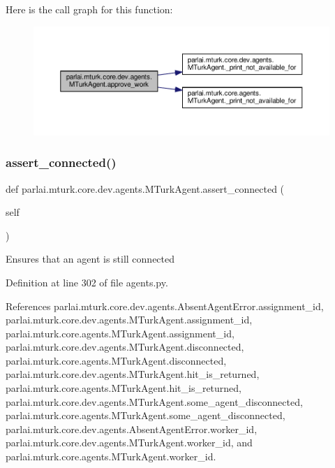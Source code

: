 Here is the call graph for this function\+:
\nopagebreak
\begin{figure}[H]
\begin{center}
\leavevmode
\includegraphics[width=350pt]{classparlai_1_1mturk_1_1core_1_1dev_1_1agents_1_1MTurkAgent_adb726f0723f56988385241a17068bea6_cgraph}
\end{center}
\end{figure}
\mbox{\label{classparlai_1_1mturk_1_1core_1_1dev_1_1agents_1_1MTurkAgent_a9761bfc34d22aae02017a258276dfaa8}} 
\subsubsection{\texorpdfstring{assert\+\_\+connected()}{assert\_connected()}}
{\footnotesize\ttfamily def parlai.\+mturk.\+core.\+dev.\+agents.\+M\+Turk\+Agent.\+assert\+\_\+connected (\begin{DoxyParamCaption}\item[{}]{self }\end{DoxyParamCaption})}

\begin{DoxyVerb}Ensures that an agent is still connected\end{DoxyVerb}
 

Definition at line 302 of file agents.\+py.



References parlai.\+mturk.\+core.\+dev.\+agents.\+Absent\+Agent\+Error.\+assignment\+\_\+id, parlai.\+mturk.\+core.\+dev.\+agents.\+M\+Turk\+Agent.\+assignment\+\_\+id, parlai.\+mturk.\+core.\+agents.\+M\+Turk\+Agent.\+assignment\+\_\+id, parlai.\+mturk.\+core.\+dev.\+agents.\+M\+Turk\+Agent.\+disconnected, parlai.\+mturk.\+core.\+agents.\+M\+Turk\+Agent.\+disconnected, parlai.\+mturk.\+core.\+dev.\+agents.\+M\+Turk\+Agent.\+hit\+\_\+is\+\_\+returned, parlai.\+mturk.\+core.\+agents.\+M\+Turk\+Agent.\+hit\+\_\+is\+\_\+returned, parlai.\+mturk.\+core.\+dev.\+agents.\+M\+Turk\+Agent.\+some\+\_\+agent\+\_\+disconnected, parlai.\+mturk.\+core.\+agents.\+M\+Turk\+Agent.\+some\+\_\+agent\+\_\+disconnected, parlai.\+mturk.\+core.\+dev.\+agents.\+Absent\+Agent\+Error.\+worker\+\_\+id, parlai.\+mturk.\+core.\+dev.\+agents.\+M\+Turk\+Agent.\+worker\+\_\+id, and parlai.\+mturk.\+core.\+agents.\+M\+Turk\+Agent.\+worker\+\_\+id.



